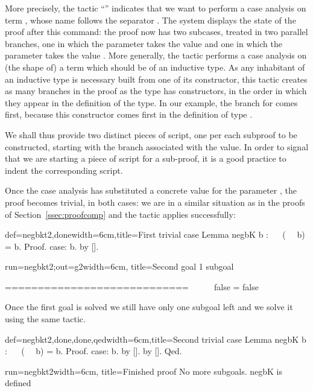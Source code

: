 More precisely, the tactic ``'' indicates that we want to
perform a case analysis on term , whose
name follows the separator \C{:}. The \Coq{} system displays the state
of the proof after this command: the proof now has two subcases,
treated in two parallel branches, one in which the parameter 
takes the value  and one in which the parameter  takes
the value . More generally, the  tactic performs a
case analysis on (the shape of) a term  which should be of an
inductive type. As any inhabitant of an inductive type is necessary
built from one of its constructor, this tactic creates as many
branches in the proof as the type has constructors, in the order in
which they appear in the definition of the type. In our example, the
branch for  comes first, because this constructor comes first
in the definition of type .

We shall thus provide two distinct pieces of
script, one per each subproof to be constructed,
starting with the branch associated with the  value. In order
to signal that we are starting a piece of script for a sub-proof, it
is a good practice to indent the corresponding script.

Once the case analysis has substituted a concrete value for the
parameter , the proof becomes trivial, in both cases: we are in a
similar situation as in the proofs of Section~\ref{ssec:proofcomp} and
the tactic  applies successfully:

\begin{coq}{def=negbkt2,done}{width=6cm,title=First trivial case}
Lemma negbK b : ~~ (~~ b) = b.
Proof.
case: b.
  by [].
\end{coq}
\begin{coqout}{run=negbkt2;out=g2}{width=6cm, title=Second goal}
1 subgoal

 ============================
   ~~ ~~ false = false
\end{coqout}

Once the first goal is solved we still have only one subgoal left and
we solve it using the same tactic.

\begin{coq}{def=negbkt2,done,done,qed}{width=6cm,title=Second trivial case}
Lemma negbK b : ~~ (~~ b) = b.
Proof.
case: b.
  by [].
by [].
Qed.
\end{coq}
\begin{coqout}{run=negbkt2}{width=6cm, title=Finished proof}
No more subgoals.
negbK is defined
$~$
$~$
$~$
$~$
\end{coqout}

